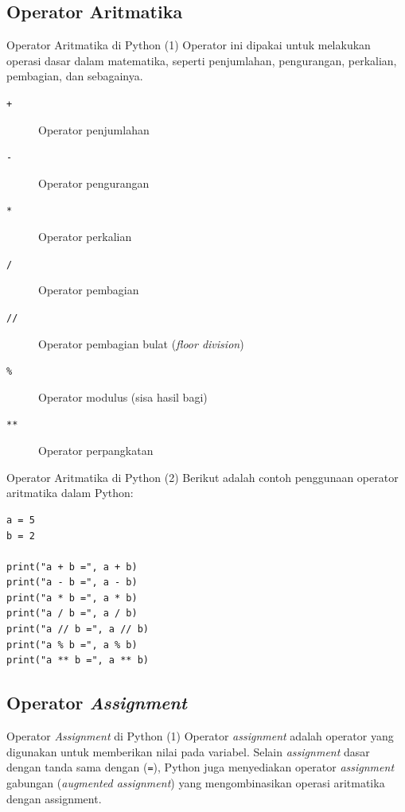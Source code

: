 \documentclass[aspectratio=169, table]{beamer}
\begin{document}
\subsection{Operator Aritmatika}
\begin{frame}{Operator Aritmatika di Python (1)}
Operator ini dipakai untuk melakukan operasi dasar dalam matematika, seperti penjumlahan, pengurangan, perkalian, pembagian, dan sebagainya.

\begin{description}
  \item[\texttt{+}] Operator penjumlahan
  \item[\texttt{-}] Operator pengurangan
  \item[\texttt{*}] Operator perkalian
  \item[\texttt{/}] Operator pembagian
  \item[\texttt{//}] Operator pembagian bulat (\textit{floor division})
  \item[\texttt{\%}] Operator modulus (sisa hasil bagi)
  \item[\texttt{**}] Operator perpangkatan
\end{description}
\end{frame}

\begin{frame}[fragile]{Operator Aritmatika di Python (2)}
Berikut adalah contoh penggunaan operator aritmatika dalam Python:
\begin{lstlisting}[style=PythonStyle, caption={Kode Python: arithmetic_operator.py}]
a = 5
b = 2

print("a + b =", a + b)
print("a - b =", a - b)
print("a * b =", a * b)
print("a / b =", a / b)
print("a // b =", a // b)
print("a % b =", a % b)
print("a ** b =", a ** b)
\end{lstlisting}
\end{frame}

\subsection{Operator \textit{Assignment}}

\begin{frame}[fragile]{Operator \textit{Assignment} di Python (1)}
Operator \textit{assignment} adalah operator yang digunakan untuk memberikan nilai pada variabel. 
Selain \textit{assignment} dasar dengan tanda sama dengan (\texttt{=}), Python juga menyediakan operator 
\textit{assignment} gabungan (\textit{augmented assignment}) yang mengombinasikan operasi aritmatika dengan assignment.
\end{frame}
\end{document}
